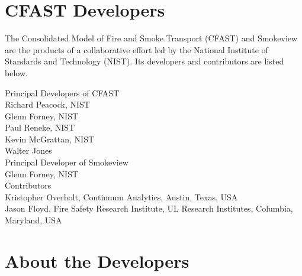 \chapter{CFAST Developers}

The Consolidated Model of Fire and Smoke Transport (CFAST) and Smokeview are the products of a collaborative effort led by the National Institute of Standards and Technology (NIST). Its developers and contributors are listed below.

\vspace{0.3in}

\begin{flushleft}

Principal Developers of CFAST  \\ [0.2in]

Richard Peacock, NIST \\
Glenn Forney, NIST \\
Paul Reneke, NIST \\
Kevin McGrattan, NIST \\
Walter Jones \\ [0.3in]

Principal Developer of Smokeview  \\ [0.2in]

Glenn Forney, NIST \\ [0.3in]

Contributors \\ [0.2in]

Kristopher Overholt, Continuum Analytics, Austin, Texas, USA \\ [0.3in]
Jason Floyd, Fire Safety Research Institute, UL Research Institutes, Columbia, Maryland, USA \\

\end{flushleft}


\chapter{About the Developers}


